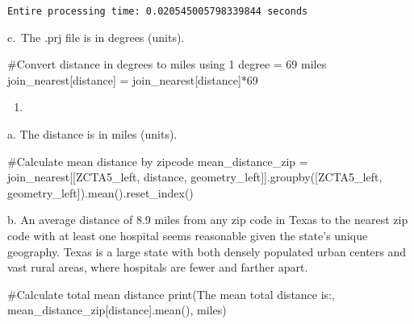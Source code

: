 \documentclass[
  letterpaper,
  DIV=11,
  numbers=noendperiod]{scrartcl}
\newenvironment{Shaded}{\begin{snugshade}}{\end{snugshade}}
\newcommand{\BuiltInTok}[1]{\textcolor[rgb]{0.00,0.23,0.31}{#1}}
\newcommand{\CommentTok}[1]{\textcolor[rgb]{0.37,0.37,0.37}{#1}}
\newcommand{\DecValTok}[1]{\textcolor[rgb]{0.68,0.00,0.00}{#1}}
\newcommand{\NormalTok}[1]{\textcolor[rgb]{0.00,0.23,0.31}{#1}}
\newcommand{\OperatorTok}[1]{\textcolor[rgb]{0.37,0.37,0.37}{#1}}
\newcommand{\StringTok}[1]{\textcolor[rgb]{0.13,0.47,0.30}{#1}}
\providecommand{\tightlist}{%
  \setlength{\itemsep}{0pt}\setlength{\parskip}{0pt}}\usepackage{longtable,booktabs,array}
\begin{document}
\begin{verbatim}
Entire processing time: 0.020545005798339844 seconds
\end{verbatim}

\hfill\break
c.~The .prj file is in degrees (units).

\begin{Shaded}
\begin{Highlighting}[]
\CommentTok{\#Convert distance in degrees to miles using 1 degree = 69 miles}
\NormalTok{join\_nearest[}\StringTok{\textquotesingle{}distance\textquotesingle{}}\NormalTok{] }\OperatorTok{=}\NormalTok{ join\_nearest[}\StringTok{\textquotesingle{}distance\textquotesingle{}}\NormalTok{]}\OperatorTok{*}\DecValTok{69}
\end{Highlighting}
\end{Shaded}

\begin{enumerate}
\def\labelenumi{\arabic{enumi}.}
\setcounter{enumi}{4}
\tightlist
\item
\end{enumerate}

\hfill\break
a. The distance is in miles (units).

\begin{Shaded}
\begin{Highlighting}[]
\CommentTok{\#Calculate mean distance by zipcode}
\NormalTok{mean\_distance\_zip }\OperatorTok{=}\NormalTok{ join\_nearest[[}\StringTok{\textquotesingle{}ZCTA5\_left\textquotesingle{}}\NormalTok{, }\StringTok{\textquotesingle{}distance\textquotesingle{}}\NormalTok{, }\StringTok{\textquotesingle{}geometry\_left\textquotesingle{}}\NormalTok{]].groupby([}\StringTok{\textquotesingle{}ZCTA5\_left\textquotesingle{}}\NormalTok{, }\StringTok{\textquotesingle{}geometry\_left\textquotesingle{}}\NormalTok{]).mean().reset\_index()}
\end{Highlighting}
\end{Shaded}

\hfill\break
b. An average distance of 8.9 miles from any zip code in Texas to the
nearest zip code with at least one hospital seems reasonable given the
state's unique geography. Texas is a large state with both densely
populated urban centers and vast rural areas, where hospitals are fewer
and farther apart.

\begin{Shaded}
\begin{Highlighting}[]
\CommentTok{\#Calculate total mean distance}
\BuiltInTok{print}\NormalTok{(}\StringTok{\textquotesingle{}The mean total distance is:\textquotesingle{}}\NormalTok{, mean\_distance\_zip[}\StringTok{\textquotesingle{}distance\textquotesingle{}}\NormalTok{].mean(), }\StringTok{\textquotesingle{}miles\textquotesingle{}}\NormalTok{)}
\end{Highlighting}
\end{Shaded}
\end{document}
